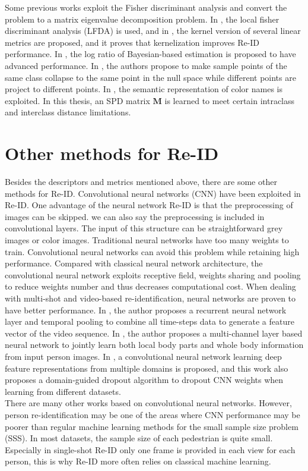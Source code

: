 Some previous works exploit the Fisher discriminant analysis and convert the problem to a matrix eigenvalue decomposition problem. In \cite{LFDA}, the local fisher discriminant analysis (LFDA) is used, and in \cite{KernelVersionMetrics}, the kernel version of several linear metrics are proposed, and it proves that kernelization improves Re-ID performance. In \cite{LOMO}, the log ratio of Bayesian-based estimation is proposed to have advanced performance. In \cite{NFST}, the authors propose to make sample points of the same class collapse to the same point in the null space while different points are project to different points. In \cite{SCNCD}, the semantic representation of color names is exploited. In this thesis, an SPD matrix $\bm{M}$ is learned to meet certain intraclass and interclass distance limitations. 

\section{Other methods for Re-ID}
Besides the descriptors and metrics mentioned above, there are some other methods for Re-ID. Convolutional neural networks (CNN) have been exploited in Re-ID. One advantage of the neural network Re-ID is that the preprocessing of images can be skipped. we can also say the preprocessing is included in convolutional layers. The input of this structure can be straightforward grey images or color images.  Traditional neural networks have too many weights to train. Convolutional neural networks can avoid this problem while retaining high performance. Compared with classical neural network architecture, the convolutional neural network exploits receptive field, weights sharing and pooling to reduce weights number and thus decreases computational cost. When dealing with multi-shot and video-based re-identification, neural networks are proven to have better performance. In \cite{RecurrentCNN}, the author proposes a recurrent neural network layer and temporal pooling to combine all time-steps data to generate a feature vector of the video sequence. In \cite{MultiCNN}, the author proposes a multi-channel layer based neural network to jointly learn both local body parts and whole body information from input person images.  In \cite{DeepfeatureCNN}, a convolutional neural network learning deep feature representations from multiple domains is proposed, and this work also proposes a domain-guided dropout algorithm to dropout CNN weights when learning from different datasets. \\
\indent There are many other works based on convolutional neural networks. However, person re-identification may be one of the areas where CNN performance may be poorer than regular machine learning methods for the small sample size problem (SSS). In most datasets, the sample size of each pedestrian is quite small. Especially in single-shot Re-ID only one frame is provided in each view for each person, this is why Re-ID more often relies on classical machine learning.

